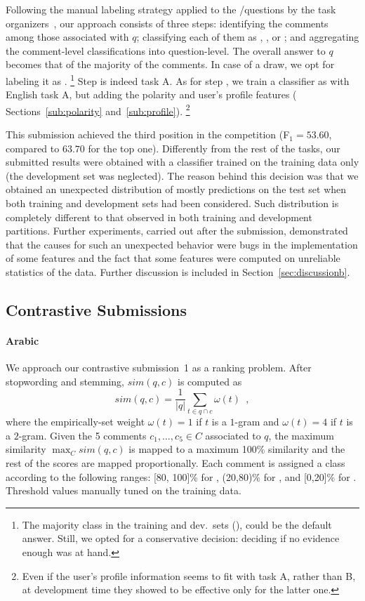 Following the manual labeling strategy applied to the \yes/\no questions by the 
task organizers~\cite{Marquez-EtAl:2015:SemEval}, our approach consists of three 
steps:
\Ni identifying the \good comments among those associated with $q$;
\Nii classifying each of them as \yes, \no, or \unsure; and 
\Niii aggregating the comment-level classifications into question-level. The 
overall answer to $q$ becomes that of the majority of the comments. In case of a
draw, we opt for labeling it as \unsure.%
\footnote{The majority class in the training and dev.\ sets (\yes), could be the default answer. Still, we opted for a conservative decision: deciding 
\unsure if no evidence enough was at hand.}
Step \Ni is indeed task A. As for step \Nii, we train a classifier as with English task A, 
but adding the polarity and user's profile features (\cf 
Sections~\ref{sub:polarity} and~\ref{sub:profile}).%
\footnote{Even if the user's profile information seems to fit with task A, 
rather than B, at development time they showed to be effective only for the 
latter one.}

This submission achieved the third position in the competition (F$_1=53.60$, 
compared to $63.70$ for the top one). Differently from the rest of the tasks, our 
submitted results were obtained with a classifier trained on the training data 
only (the development set was neglected). The reason behind this decision was 
that we obtained an unexpected distribution of mostly \yes predictions on the 
test set when both training and development sets had been considered. Such 
distribution is completely different to that observed in both training and 
development partitions. Further experiments, carried out after the submission, 
demonstrated that the causes for such an unexpected behavior were bugs in the 
implementation of some features and the fact that some features were computed on 
unreliable statistics of the data. Further discussion is included in 
Section~\ref{sec:discussionb}.


\subsection{Contrastive Submissions}
\label{sub:contrastive}

\paragraph{Arabic} 

We approach our contrastive submission~1 as a ranking problem. After 
stopwording and stemming, $sim(q,c)$ is computed as 
\begin{equation}
 sim(q,c) = \frac{1}{|q|} \sum_{t\in q\cap c} \omega(t) \enspace ,
 \label{eq:overlap}
\end{equation}
% 
where the empirically-set weight $\omega(t)=1$ if $t$ is a $1$-gram and 
$\omega(t)=4$ if $t$ is a $2$-gram. Given the 5 comments $c_1,\ldots,c_5\in C$ 
associated to $q$, the maximum similarity $\max_C sim(q,c)$ is mapped to a 
maximum 100\% similarity and the rest of the scores are mapped proportionally. 
Each comment is assigned a class according to the following ranges: [80, 100]\% 
for \dir, (20,80)\% for \rel, and [0,20]\% for \irel. Threshold values manually 
tuned on the training data.


